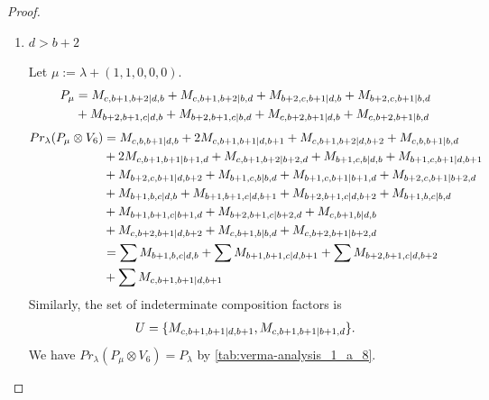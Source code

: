 \begin{proof}
\begin{enumerate}
\begin{enumerate}
\begin{enumerate}
    \item $ d > b+2  $ \par
        Let $\mu:=\lambda + (1,1,0,0,0) $.
        \begin{equation}\notag
          \begin{aligned}
            P_\mu &= M_{c,b+1,b+2|d,b}
+ M_{c,b+1,b+2|b,d}
+ M_{b+2,c,b+1|d,b}
+ M_{b+2,c,b+1|b,d}\\
                                               &
+ M_{b+2,b+1,c|d,b}
+ M_{b+2,b+1,c|b,d}
+ M_{c,b+2,b+1|d,b}
+ M_{c,b+2,b+1|b,d}
          \end{aligned}
        \end{equation}
        \begin{equation}\notag
          \begin{aligned}
            Pr_{\lambda}(P_\mu \otimes V_{6}) &=
M_{c,b,b+1|d,b}
+ 2M_{c,b+1,b+1|d,b+1}
+ M_{c,b+1,b+2|d,b+2}
+ M_{c,b,b+1|b,d}\\
                                               &
+ 2M_{c,b+1,b+1|b+1,d}
+ M_{c,b+1,b+2|b+2,d}
+ M_{b+1,c,b|d,b}
+ M_{b+1,c,b+1|d,b+1}\\
                                               &
+ M_{b+2,c,b+1|d,b+2}
+ M_{b+1,c,b|b,d}
+ M_{b+1,c,b+1|b+1,d}
+ M_{b+2,c,b+1|b+2,d}\\
                                               &
+ M_{b+1,b,c|d,b}
+ M_{b+1,b+1,c|d,b+1}
+ M_{b+2,b+1,c|d,b+2}
+ M_{b+1,b,c|b,d}\\
                                               &
+ M_{b+1,b+1,c|b+1,d}
+ M_{b+2,b+1,c|b+2,d}
+ M_{c,b+1,b|d,b}\\
                                               &
+ M_{c,b+2,b+1|d,b+2}
+ M_{c,b+1,b|b,d}
+ M_{c,b+2,b+1|b+2,d} \\
                                               &=
\sum M_{b+1,b,c|d,b}
+ \sum M_{b+1,b+1,c|d,b+1}
+ \sum M_{b+2,b+1,c|d,b+2}\\
                                               &
+ \sum M_{c,b+1,b+1|d,b+1}
          \end{aligned}
        \end{equation}
      Similarly, the set of indeterminate composition factors is 
\begin{equation}\notag
  \begin{aligned}
     U = \{
M_{c,b+1,b+1|d,b+1},
M_{c,b+1,b+1|b+1,d}
\}.
  \end{aligned}
\end{equation}
      We have $Pr_{\lambda}(P_\mu \otimes V_{6}) = P_\lambda  $ by \cref{tab:verma-analysis_1_a_8}.

\end{enumerate}
\end{enumerate}
\end{enumerate}
\end{proof}
